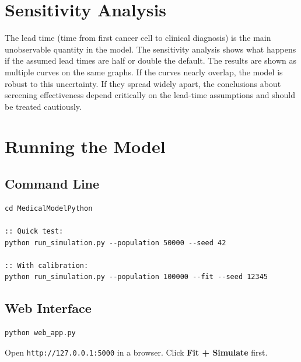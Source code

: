 \documentclass[12pt,a4paper]{article}
\begin{document}
\section{Sensitivity Analysis}

The lead time (time from first cancer cell to clinical diagnosis) is the main unobservable quantity in the model. The sensitivity analysis shows what happens if the assumed lead times are half or double the default. The results are shown as multiple curves on the same graphs. If the curves nearly overlap, the model is robust to this uncertainty. If they spread widely apart, the conclusions about screening effectiveness depend critically on the lead-time assumptions and should be treated cautiously.

\section{Running the Model}

\subsection{Command Line}

\begin{verbatim}
cd MedicalModelPython

:: Quick test:
python run_simulation.py --population 50000 --seed 42

:: With calibration:
python run_simulation.py --population 100000 --fit --seed 12345
\end{verbatim}

\subsection{Web Interface}

\begin{verbatim}
python web_app.py
\end{verbatim}

Open \texttt{http://127.0.0.1:5000} in a browser. Click \textbf{Fit + Simulate} first.
\end{document}
